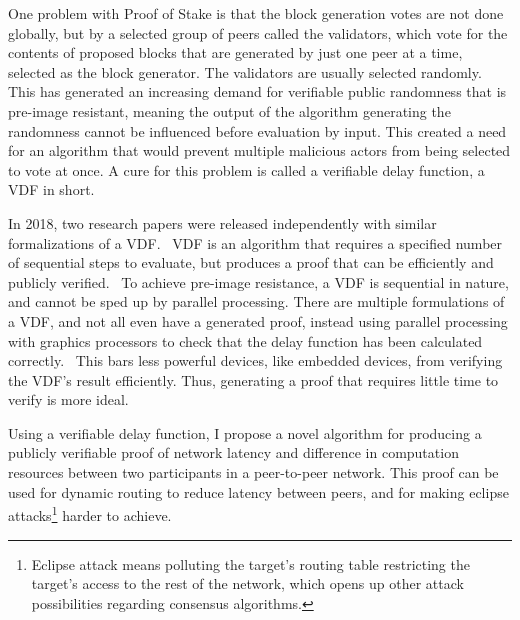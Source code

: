 One problem with Proof of Stake is that the block generation votes are not done globally, but by a selected group of peers called the validators, which vote for the contents of proposed blocks that are generated by just one peer at a time, selected as the block generator. The validators are usually selected randomly. This has generated an increasing demand for verifiable public randomness that is pre-image resistant, meaning the output of the algorithm generating the randomness cannot be influenced before evaluation by input. This created a need for an algorithm that would prevent multiple malicious actors from being selected to vote at once. A cure for this problem is called a verifiable delay function, a VDF in short.

In 2018, two research papers were released independently with similar formalizations of a VDF.~\cite{Wesolowski2018-rf, Pietrzak2018-xs} VDF is an algorithm that requires a specified number of sequential steps to evaluate, but produces a proof that can be efficiently and publicly verified.~\cite{Boneh_undated-ml} To achieve pre-image resistance, a VDF is sequential in nature, and cannot be sped up by parallel processing. There are multiple formulations of a VDF, and not all even have a generated proof, instead using parallel processing with graphics processors to check that the delay function has been calculated correctly.~\cite{Yakovenko2018-zn} This bars less powerful devices, like embedded devices, from verifying the VDF's result efficiently. Thus, generating a proof that requires little time to verify is more ideal.~\cite{Boneh_undated-ml}

Using a verifiable delay function, I propose a novel algorithm for producing a publicly verifiable proof of network latency and difference in computation resources between two participants in a peer-to-peer network. This proof can be used for dynamic routing to reduce latency between peers, and for making eclipse attacks\footnote{Eclipse attack means polluting the target's routing table restricting the target's access to the rest of the network, which opens up other attack possibilities regarding consensus algorithms.} harder to achieve.
